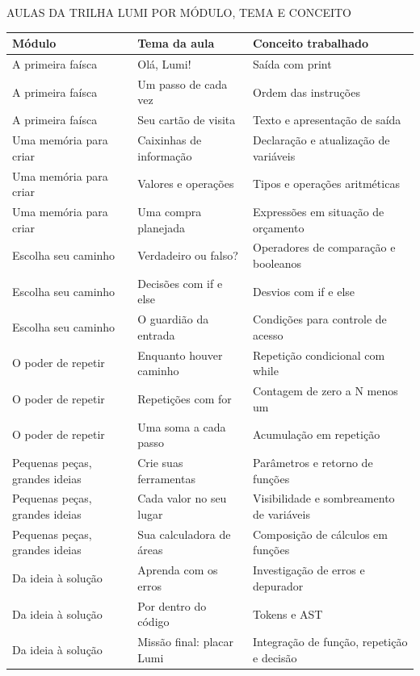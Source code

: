 \documentclass[
    12pt
    ,oneside
    ,a4paper
    ,chapter=TITLE
    ,section=TITLE
    ,sumario=abnt-6027-2012]{abntex2}
\renewcommand{\legenda}[2][]{%
    \centering
    \caption[\MakeTextUppercase{#2}]{\maybeLabel{#1}\MakeTextUppercase{#2}}%
}
\begin{document}
\begin{quadro}[htb]
\centering
\legenda[quad:aulas_lumi]{Aulas da Trilha Lumi por módulo, tema e conceito}
\footnotesize
\begin{tabular}{|P{3.1cm}|P{4.5cm}|P{5.2cm}|}
\hline
Módulo & Tema da aula & Conceito trabalhado \\
\hline\hline
A primeira faísca & Olá, Lumi! & Saída com print \\
\hline
A primeira faísca & Um passo de cada vez & Ordem das instruções \\
\hline
A primeira faísca & Seu cartão de visita & Texto e apresentação de saída \\
\hline
Uma memória para criar & Caixinhas de informação & Declaração e atualização de variáveis \\
\hline
Uma memória para criar & Valores e operações & Tipos e operações aritméticas \\
\hline
Uma memória para criar & Uma compra planejada & Expressões em situação de orçamento \\
\hline
Escolha seu caminho & Verdadeiro ou falso? & Operadores de comparação e booleanos \\
\hline
Escolha seu caminho & Decisões com if e else & Desvios com if e else \\
\hline
Escolha seu caminho & O guardião da entrada & Condições para controle de acesso \\
\hline
O poder de repetir & Enquanto houver caminho & Repetição condicional com while \\
\hline
O poder de repetir & Repetições com for & Contagem de zero a N menos um \\
\hline
O poder de repetir & Uma soma a cada passo & Acumulação em repetição \\
\hline
Pequenas peças, grandes ideias & Crie suas ferramentas & Parâmetros e retorno de funções \\
\hline
Pequenas peças, grandes ideias & Cada valor no seu lugar & Visibilidade e sombreamento de variáveis \\
\hline
Pequenas peças, grandes ideias & Sua calculadora de áreas & Composição de cálculos em funções \\
\hline
Da ideia à solução & Aprenda com os erros & Investigação de erros e depurador \\
\hline
Da ideia à solução & Por dentro do código & Tokens e AST \\
\hline
Da ideia à solução & Missão final: placar Lumi & Integração de função, repetição e decisão \\
\hline
\end{tabular}
\vspace{0.2cm}
\end{quadro}
\FloatBarrier
\end{document}
